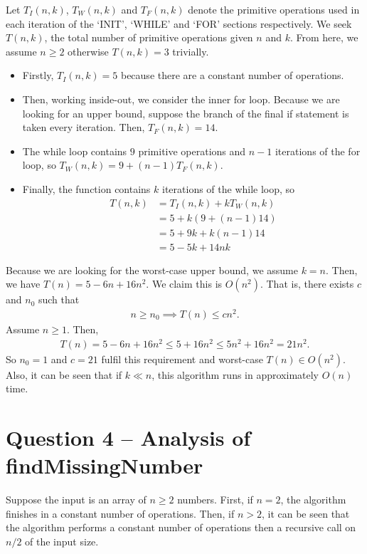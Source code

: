 \documentclass[11pt,a4paper]{article} %
\begin{document}
Let $T_I(n, k)$, $T_W(n, k)$ and $T_F(n, k)$ denote the primitive operations used in 
each iteration of the `INIT', `WHILE' and `FOR' sections respectively. We seek $T(n, k)$, the total
number of primitive operations given $n$ and $k$. From here, we assume $n \ge 2$
otherwise $T(n, k) = 3$ trivially.
\begin{itemize}
    \item Firstly, $T_I(n, k) = 5$ because there are a constant number of operations.
    \item Then, working inside-out, we consider the inner for loop. Because we are looking for
    an upper bound, suppose the branch of the final if statement is taken every iteration.
    Then, $T_F(n, k) = 14$.
    \item The while loop contains $9$ primitive operations and $n-1$ iterations of the for loop, so 
    $T_W(n, k) = 9 + (n-1)T_F(n, k)$.
    \item Finally, the function contains $k$ iterations of the while loop, so 
    \begin{align*}
        T(n, k) &= T_I(n, k) + k T_W(n, k) \\ 
        &= 5 + k(9 + (n-1)14) \\ 
        &= 5 + 9k + k(n-1)14 \\ 
        &= 5 - 5k + 14nk
    \end{align*}
\end{itemize}
Because we are looking for the worst-case upper bound, we assume $k = n$. Then, we have 
$T(n) = 5 - 6n + 16n^2$. We claim this is $O(n^2)$. That is, there exists $c$ and $n_0$ such that 
\begin{align*}
    n \ge n_0 \implies T(n) \le cn^2.
\end{align*}
Assume $n \ge 1$. Then,
\begin{align*}
    T(n) = 5 - 6n + 16n^2 \le 5 + 16n^2 \le 5n^2 + 16n^2 = 21n^2.
\end{align*}
So $n_0 = 1$ and $c = 21$ fulfil this requirement and worst-case 
$T(n) \in O(n^2)$.
Also, it can be seen that if $k \ll n$, this algorithm runs in approximately
$O(n)$ time.


\section*{Question 4 -- {Analysis of {findMissingNumber}}}
Suppose the input is an array of $n \ge 2$ numbers. 
First, if $n = 2$, the algorithm finishes in a constant number of operations.
Then, if $n > 2$, it can be seen that the algorithm performs a constant 
number of operations then a recursive call on $n/2$ of the input size.
\end{document}
